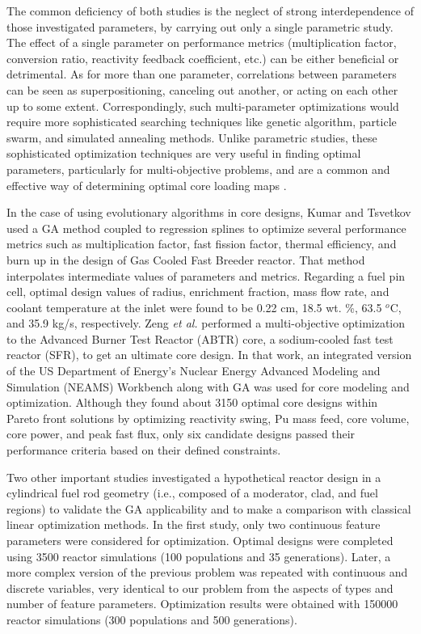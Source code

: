     The common deficiency of both studies is the neglect of strong interdependence of those investigated parameters, by carrying out only a single parametric study. The effect of a single parameter on performance metrics (multiplication factor, conversion ratio, reactivity feedback coefficient, etc.) can be either beneficial or detrimental. As for more than one parameter, correlations between parameters can be seen as superpositioning, canceling out another, or acting on each other up to some extent. Correspondingly, such multi-parameter optimizations would require more sophisticated searching techniques like genetic algorithm, particle swarm, and simulated annealing methods. Unlike parametric studies, these sophisticated optimization techniques are very useful in finding optimal parameters, particularly for multi-objective problems, and are a common and effective way of determining optimal core loading maps \cite{Nissan2019}.

    In the case of using evolutionary algorithms in core designs, Kumar and Tsvetkov \cite{Kumar2015} used a \gls{GA} method coupled to regression splines to optimize several performance metrics such as multiplication factor, fast fission factor, thermal efficiency, and burn up in the design of Gas Cooled Fast Breeder reactor. That method interpolates intermediate values of parameters and metrics. Regarding a fuel pin cell, optimal design values of radius, enrichment fraction, mass flow rate, and coolant temperature at the inlet were found to be 0.22 cm, 18.5 wt. \%, 63.5  $^o$C, and 35.9 kg/s, respectively. Zeng \emph{et al.} \cite{Zeng2020} performed a multi-objective optimization to the Advanced Burner Test Reactor (ABTR) core, a sodium-cooled fast test reactor (SFR), to get an ultimate core design. In that work, an integrated version of the US Department of Energy's Nuclear Energy Advanced Modeling and Simulation (NEAMS) Workbench \cite{neams2019} along with \gls{GA} was used for core modeling and optimization. Although they found about 3150 optimal core designs within Pareto front solutions by optimizing reactivity swing, Pu mass feed, core volume, core power, and peak fast flux, only six candidate designs passed their performance criteria based on their defined constraints.

    Two other important studies \cite{pereira1999, pereira2003} investigated a hypothetical reactor design in a cylindrical fuel rod geometry (i.e., composed of a moderator, clad, and fuel regions) to validate the \gls{GA} applicability and to make a comparison with classical linear optimization methods. In the first study, only two continuous feature parameters were considered for optimization. Optimal designs were completed using 3500 reactor simulations (100 populations and 35 generations). Later, a more complex version of the previous problem was repeated with continuous and discrete variables, very identical to our problem from the aspects of types and number of feature parameters. Optimization results were obtained with 150000 reactor simulations (300 populations and 500 generations).

